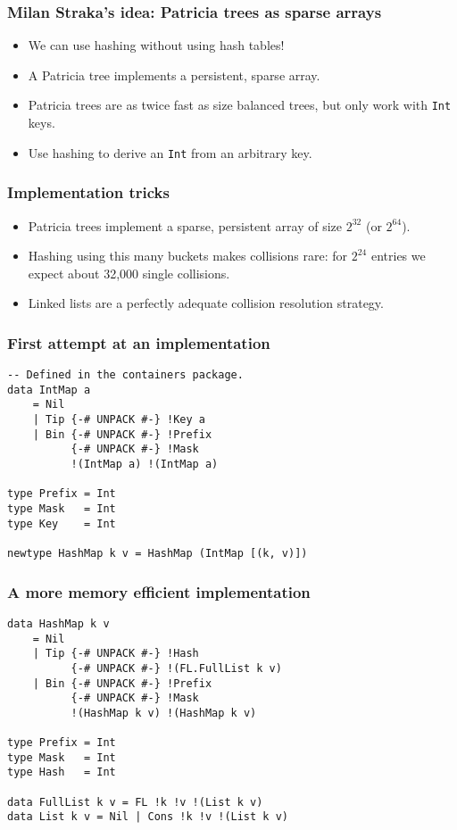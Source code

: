 \documentclass{beamer}
\begin{document}
\begin{frame}
  \frametitle{Milan Straka's idea: Patricia trees as sparse arrays}
  \begin{itemize}
  \item We can use hashing without using hash tables!
  \item A Patricia tree implements a persistent, sparse array.
  \item Patricia trees are as twice fast as size balanced trees, but
    only work with \lstinline!Int! keys.
  \item Use hashing to derive an \lstinline!Int! from an arbitrary
    key.
  \end{itemize}
\end{frame}

\begin{frame}
  \frametitle{Implementation tricks}
  \begin{itemize}
  \item Patricia trees implement a sparse, persistent array of size
    $2^{32}$ (or $2^{64}$).
  \item Hashing using this many buckets makes collisions rare: for
    $2^{24}$ entries we expect about 32,000 single collisions.
  \item Linked lists are a perfectly adequate collision resolution
    strategy.
  \end{itemize}
\end{frame}

\begin{frame}[fragile]
  \frametitle{First attempt at an implementation}
  \begin{lstlisting}
-- Defined in the containers package.
data IntMap a
    = Nil
    | Tip {-# UNPACK #-} !Key a
    | Bin {-# UNPACK #-} !Prefix
          {-# UNPACK #-} !Mask
          !(IntMap a) !(IntMap a)

type Prefix = Int
type Mask   = Int
type Key    = Int

newtype HashMap k v = HashMap (IntMap [(k, v)])
  \end{lstlisting}
\end{frame}


\begin{frame}[fragile]
  \frametitle{A more memory efficient implementation}
  \begin{lstlisting}
data HashMap k v
    = Nil
    | Tip {-# UNPACK #-} !Hash
          {-# UNPACK #-} !(FL.FullList k v)
    | Bin {-# UNPACK #-} !Prefix
          {-# UNPACK #-} !Mask
          !(HashMap k v) !(HashMap k v)

type Prefix = Int
type Mask   = Int
type Hash   = Int

data FullList k v = FL !k !v !(List k v)
data List k v = Nil | Cons !k !v !(List k v)
  \end{lstlisting}
\end{frame}
\end{document}
